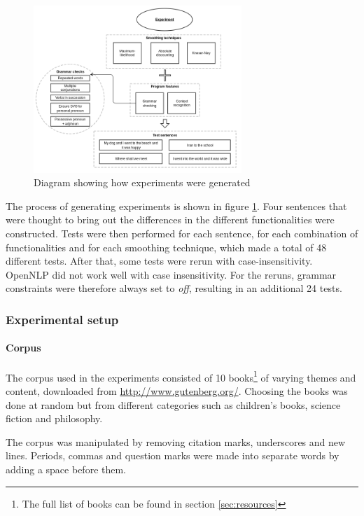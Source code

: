 \begin{figure}[t]
\center
\includegraphics[width=0.7\textwidth]{img/experiment_diagram.png}
\caption{Diagram showing how experiments were generated}
\label{fig:experiments}
\end{figure}

The process of generating experiments is shown in figure \ref{fig:experiments}. Four sentences that were thought to bring out the differences in the different functionalities were constructed. Tests were then performed for each sentence, for each combination of functionalities and for each smoothing technique, which made a total of 48 different tests. After that, some tests were rerun with case-insensitivity. OpenNLP did not work well with case insensitivity. For the reruns, grammar constraints were therefore always set to \emph{off}, resulting in an additional 24 tests.

\subsubsection{Experimental setup}
\paragraph{Corpus}
The corpus used in the experiments consisted of 10 books\footnote{The full list of books can be found in section \ref{sec:resources}} of varying themes and content, downloaded from \url{http://www.gutenberg.org/}. Choosing the books was done at random but from different categories such as children's books, science fiction and philosophy.

The corpus was manipulated by removing citation marks, underscores and new lines. Periods, commas and question marks were made into separate words by adding a space before them.

